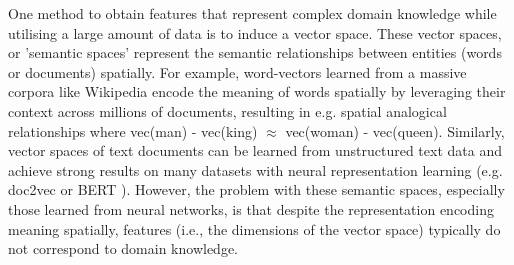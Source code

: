 




One method to obtain features that represent complex domain knowledge while utilising a large amount of data is to induce a vector space. These vector spaces, or 'semantic spaces' represent the semantic relationships between entities (words or documents)  spatially. For example, word-vectors \cite{Pennington2014} \cite{Mikolov2013} learned from a massive corpora like Wikipedia encode the meaning of words spatially by leveraging their context across millions of documents, resulting in e.g. spatial analogical relationships where vec(man) - vec(king) $\approx$ vec(woman) - vec(queen). Similarly, vector spaces of text documents can be learned from unstructured text data and achieve strong results on many datasets  with neural representation learning (e.g. doc2vec \cite{Le2014} or BERT \cite{Devlin2014}). However, the problem with these semantic spaces, especially those learned from neural networks, is that despite the representation encoding meaning spatially,  features (i.e., the dimensions of the vector space)  typically do not correspond to domain knowledge. 

